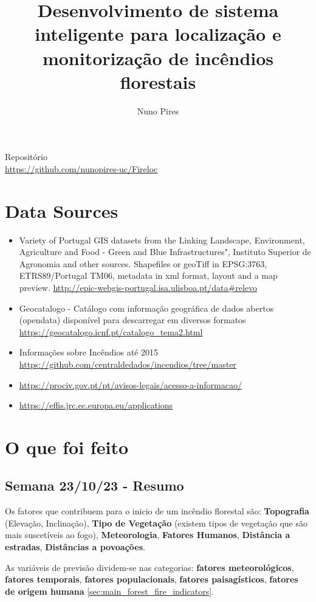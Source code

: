\documentclass{article}
\title{Desenvolvimento de sistema inteligente para localização e monitorização de incêndios florestais}
\author{Nuno Pires}
\begin{document}
\maketitle

\begin{center}
Repositório\\
\url{https://github.com/nunopires-uc/Fireloc}
\end{center}


\section{Data Sources}
\begin{itemize}
    \item Variety of Portugal GIS datasets from the Linking Landscape, Environment, Agriculture and Food - Green and Blue Infrastructures", Instituto Superior de Agronomia and other sources. Shapefiles or geoTiff in EPSG:3763, ETRS89/Portugal TM06, metadata in xml format, layout and a map preview. \url{http://epic-webgis-portugal.isa.ulisboa.pt/data#relevo}
    \item Geocatalogo - Catálogo com informação geográfica de dados abertos (opendata) disponível para descarregar em diversos formatos \url{https://geocatalogo.icnf.pt/catalogo_tema2.html}
    \item Informações sobre Incêndios até 2015 \url{https://github.com/centraldedados/incendios/tree/master}
    \item \url{https://prociv.gov.pt/pt/avisos-legais/acesso-a-informacao/}
    \item \url{https://effis.jrc.ec.europa.eu/applications}
\end{itemize}

\section{O que foi feito}
\subsection{Semana 23/10/23 - Resumo}
Os fatores que contribuem para o inicio de um incêndio florestal são:  \textbf{Topografia} (Elevação, Inclinação), \textbf{Tipo de Vegetação} (existem tipos de vegetação que são mais suscetíveis ao fogo), \textbf{Meteorologia}, \textbf{Fatores Humanos}, \textbf{Distância a estradas}, \textbf{Distâncias a povoações}. 


As variáveis de previsão dividem-se nas categorias: \textbf{fatores meteorológicos}, \textbf{fatores temporais}, \textbf{fatores populacionais}, \textbf{fatores paisagísticos}, \textbf{fatores de origem humana} \ref{sec:main_forest_fire_indicators}.
\end{document}
